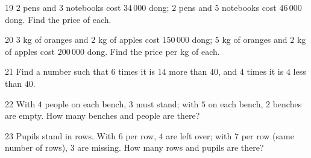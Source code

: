 \gap
\begin{probbox}{19}{\relax}
$2$ pens and $3$ notebooks cost $34\,000$ dong; $2$ pens and $5$ notebooks cost $46\,000$ dong. Find the price of each.
\end{probbox}
\gap
\begin{probbox}{20}{\relax}
$3$ kg of oranges and $2$ kg of apples cost $150\,000$ dong; $5$ kg of oranges and $2$ kg of apples cost $200\,000$ dong. Find the price per kg of each.
\end{probbox}
\gap
\begin{probbox}{21}{\relax}
Find a number such that $6$ times it is $14$ more than $40$, and $4$ times it is $4$ less than $40$.
\end{probbox}
\gap
\begin{probbox}{22}{\relax}
With $4$ people on each bench, $3$ must stand; with $5$ on each bench, $2$ benches are empty. How many benches and people are there?
\end{probbox}
\gap
\begin{probbox}{23}{\relax}
Pupils stand in rows. With $6$ per row, $4$ are left over; with $7$ per row (same number of rows), $3$ are missing. How many rows and pupils are there?
\end{probbox}
